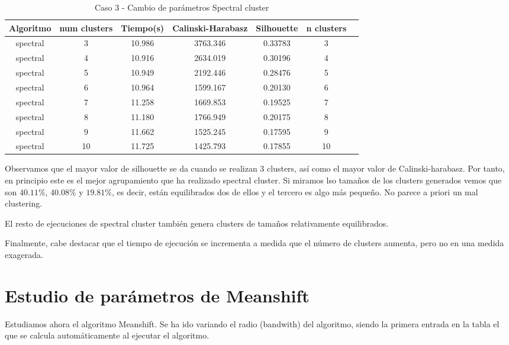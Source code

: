 \begin{table}[H]
\centering
\caption{Caso 3 - Cambio de parámetros Spectral cluster}
\label{tab:c3_spectral}
\begin{tabular}{ccccccc}
\toprule
Algoritmo & num clusters & Tiempo(s) & Calinski-Harabasz & Silhouette & n clusters \\
\midrule
spectral & 3 & 10.986 & 3763.346 & 0.33783 & 3 \\
spectral & 4 & 10.916 & 2634.019 & 0.30196 & 4 \\
spectral & 5 & 10.949 & 2192.446 & 0.28476 & 5 \\
spectral & 6 & 10.964 & 1599.167 & 0.20130 & 6 \\
spectral & 7 & 11.258 & 1669.853 & 0.19525 & 7 \\
spectral & 8 & 11.180 & 1766.949 & 0.20175 & 8 \\
spectral & 9 & 11.662 & 1525.245 & 0.17595 & 9 \\
spectral & 10 & 11.725 & 1425.793 & 0.17855 & 10 \\
\bottomrule
\end{tabular}
\end{table}

Observamos que el mayor valor de silhouette se da cuando se realizan 3 clusters, así como el mayor valor de Calinski-harabasz. Por tanto, en principio este es el mejor agrupamiento que ha realizado spectral cluster. Si miramos lso tamaños de los clusters generados vemos que son $40.11\%$, $40.08\%$ y $19.81\%$, es decir, están equilibrados dos de ellos y el tercero es algo más pequeño. No parece a priori un mal clustering.

El resto de ejecuciones de spectral cluster también genera clusters de tamaños relativamente equilibrados.

Finalmente, cabe destacar que el tiempo de ejecución se incrementa a medida que el número de clusters aumenta, pero no en una medida exagerada.


\section{Estudio de parámetros de Meanshift}

Estudiamos ahora el algoritmo Meanshift. Se ha ido variando el radio (bandwith) del algoritmo, siendo la primera entrada en la tabla el que se calcula automáticamente al ejecutar el algoritmo.

